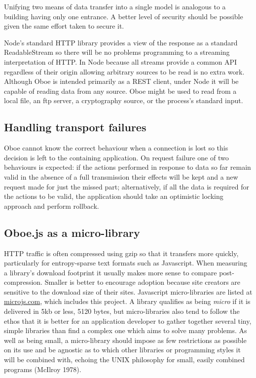 \documentclass[12pt, ]{article}
\begin{document}
Unifying two means of data transfer into a single model is analogous to
a building having only one entrance. A better level of security should
be possible given the same effort taken to secure it.

Node's standard HTTP library provides a view of the response as a
standard ReadableStream so there will be no problems programming to a
streaming interpretation of HTTP. In Node because all streams provide a
common API regardless of their origin allowing arbitrary sources to be
read is no extra work. Although Oboe is intended primarily as a REST
client, under Node it will be capable of reading data from any source.
Oboe might be used to read from a local file, an ftp server, a
cryptography source, or the process's standard input.

\subsection{Handling transport
failures}\label{handling-transport-failures}

Oboe cannot know the correct behaviour when a connection is lost so this
decision is left to the containing application. On request failure one
of two behaviours is expected: if the actions performed in response to
data so far remain valid in the absence of a full transmission their
effects will be kept and a new request made for just the missed part;
alternatively, if all the data is required for the actions to be valid,
the application should take an optimistic locking approach and perform
rollback.

\subsection{Oboe.js as a
micro-library}\label{oboe.js-as-a-micro-library}

HTTP traffic is often compressed using gzip so that it transfers more
quickly, particularly for entropy-sparse text formats such as
Javascript. When measuring a library's download footprint it usually
makes more sense to compare post-compression. Smaller is better to
encourage adoption because site creators are sensitive to the download
size of their sites. Javascript micro-libraries are listed at
\href{http://microjs.com}{microjs.com}, which includes this project. A
library qualifies as being \emph{micro} if it is delivered in 5kb or
less, 5120 bytes, but micro-libraries also tend to follow the ethos that
it is better for an application developer to gather together several
tiny, simple libraries than find a complex one which aims to solve many
problems. As well as being small, a micro-library should impose as few
restrictions as possible on its use and be agnostic as to which other
libraries or programming styles it will be combined with, echoing the
UNIX philosophy for small, easily combined programs (McIlroy 1978).
\end{document}
